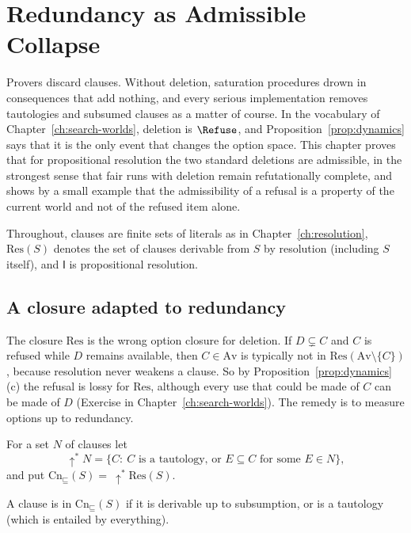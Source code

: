 \chapter{Redundancy as Admissible Collapse}
\label{ch:redundancy}

Provers discard clauses. Without deletion, saturation procedures drown in consequences that add nothing, and every serious implementation removes tautologies and subsumed clauses as a matter of course. In the vocabulary of Chapter~\ref{ch:search-worlds}, deletion is $\Refuse$, and Proposition~\ref{prop:dynamics} says that it is the only event that changes the option space. This chapter proves that for propositional resolution the two standard deletions are admissible, in the strongest sense that fair runs with deletion remain refutationally complete, and shows by a small example that the admissibility of a refusal is a property of the current world and not of the refused item alone.

Throughout, clauses are finite sets of literals as in Chapter~\ref{ch:resolution}, $\mathrm{Res}(S)$ denotes the set of clauses derivable from $S$ by resolution (including $S$ itself), and $\mathsf I$ is propositional resolution.

\section{A closure adapted to redundancy}

The closure $\mathrm{Res}$ is the wrong option closure for deletion. If $D\subsetneq C$ and $C$ is refused while $D$ remains available, then $C\in\mathrm{Av}$ is typically not in $\mathrm{Res}(\mathrm{Av}\setminus\{C\})$, because resolution never weakens a clause. So by Proposition~\ref{prop:dynamics}(c) the refusal is lossy for $\mathrm{Res}$, although every use that could be made of $C$ can be made of $D$ (Exercise in Chapter~\ref{ch:search-worlds}). The remedy is to measure options up to redundancy.

\begin{definition}
\label{def:updown}
For a set $N$ of clauses let
\[
\uparrow^{\ast}\!N=\{C:\ C\text{ is a tautology, or }E\subseteq C\text{ for some }E\in N\},
\]
and put $\mathrm{Cn}_{\sqsubseteq}(S)=\ \uparrow^{\ast}\!\mathrm{Res}(S)$.
\end{definition}

A clause is in $\mathrm{Cn}_{\sqsubseteq}(S)$ if it is derivable up to subsumption, or is a tautology (which is entailed by everything).

